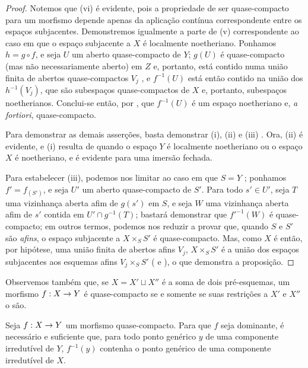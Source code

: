 \documentclass[oneside]{amsart}
\makeatletter
\newcommand{\ega@arrow}[2]{\mathchoice{#1}{#2}{#2}{#2}}
\renewcommand{\to}{\ega@arrow{\longrightarrow}{\rightarrow}}
\newcommand{\oldpage}[2][]{{\marginnote{\normalfont\textbf{#1}~|~#2}}\ignorespaces}
\let\EGAOriginalLabel\label
\renewcommand{\label}[1]{\phantomsection\EGAOriginalLabel{#1}}
\makeatother
\begin{document}
\begin{proof}
Notemos que (vi) é evidente, pois a propriedade de ser quase-compacto para um morfismo depende apenas da aplicação contínua correspondente entre os espaços subjacentes.
Demonstremos igualmente a parte de (v) correspondente ao caso em que o espaço subjacente a $X$ é localmente noetheriano.
Ponhamos $h=g\circ f$, e seja $U$ um aberto quase-compacto de $Y$;
$g(U)$ é quase-compacto (mas não necessariamente aberto) em $Z$ e, portanto, está contido numa união finita de abertos quase-compactos $V_j$ , e $f^{-1}(U)$ está então contido na união dos $h^{-1}(V_j)$, que são subespaços quase-compactos de $X$ e, portanto, subespaços noetherianos.
Conclui-se então, por , que $f^{-1}(U)$ é um espaço noetheriano e, \emph{a fortiori}, quase-compacto.

Para demonstrar as demais asserções, basta demonstrar (i), (ii) e (iii) .
Ora, (ii) é evidente, e (i) resulta de  quando o espaço $Y$ é localmente noetheriano ou o espaço $X$ é noetheriano, e é evidente para uma imersão fechada.

Para estabelecer (iii),
\oldpage[I]{154}
podemos nos limitar ao caso em que $S=Y$ ;
ponhamos $f'=f_{(S')}$, e seja $U'$ um aberto quase-compacto de $S'$.
Para todo $s'\in U'$, seja $T$ uma vizinhança aberta afim de $g(s')$ em $S$, e seja $W$ uma vizinhança aberta afim de $s'$ contida em $U'\cap g^{-1}(T)$;
bastará demonstrar que $f'^{-1}(W)$ é quase-compacto;
em outros termos, podemos nos reduzir a provar que, quando $S$ e $S'$ são \emph{afins}, o espaço subjacente a $X\times_S S'$ é quase-compacto.
Mas, como $X$ é então, por hipótese, uma união finita de abertos afins $V_j$, $X\times_S S'$ é a união dos espaços subjacentes aos esquemas afins $V_j\times_S S'$ ( e ), o que demonstra a proposição.
\end{proof}

Observemos também que, se $X=X'\sqcup X''$ é a soma de dois pré-esquemas, um morfismo $f:X\to Y$ é quase-compacto se e somente se suas restrições a $X'$ e $X''$ o são.

\begin{proposition}[6.6.5]
\label{I.6.6.5}
Seja $f:X\to Y$ um morfismo quase-compacto.
Para que $f$ seja dominante, é necessário e suficiente que, para todo ponto genérico $y$ de uma componente irredutível de $Y$, $f^{-1}(y)$ contenha o ponto genérico de uma componente irredutível de $X$.
\end{proposition}
\end{document}
